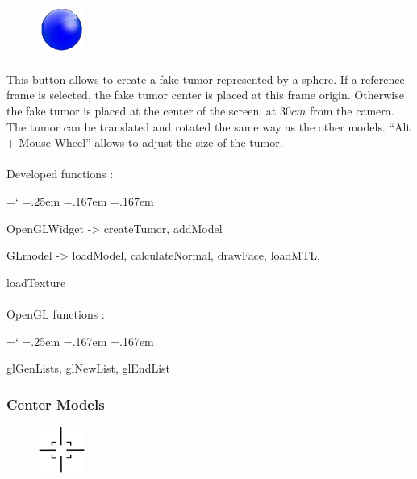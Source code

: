 \documentclass[12pt]{report}
\DeclareRobustCommand*{\ttfamily}{
  \origttfamily
  \hyphenchar\font=`\-\relax
  \fontdimen3\font=.25em\relax
  \fontdimen4\font=.167em\relax
  \fontdimen7\font=.167em\relax
}
\newenvironment{code}{\ttfamily}{}
\begin{document}
\begin{figure}
\vspace{-20pt}
\includegraphics[width=1.5cm]{icons/tumor.png}
\end{figure}
\paragraph{}
	This button allows to create a fake tumor represented by a sphere. If a reference frame is selected, the fake tumor center is placed at this frame origin. Otherwise the fake tumor is placed at the center of the screen, at $30cm$ from the camera. The tumor can be translated and rotated the same way as the other models.
``Alt + Mouse Wheel'' allows to adjust the size of the tumor.


\paragraph{}
	Developed functions :

	\begin{code}
	OpenGLWidget -> createTumor, addModel

	GLmodel -> loadModel, calculateNormal, drawFace, loadMTL,

	loadTexture
	\end{code}

\paragraph{}
	OpenGL functions :

	\begin{code}
	glGenLists, glNewList, glEndList
	\end{code}



\subsubsection{Center Models}

\begin{figure}
\vspace{-20pt}
\includegraphics[width=1.5cm]{icons/center.png}
\end{figure}
\end{document}
